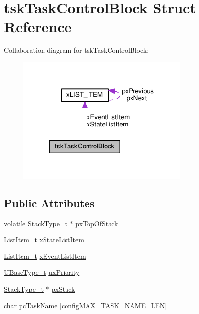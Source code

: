 \hypertarget{structtsk_task_control_block}{}\section{tsk\+Task\+Control\+Block Struct Reference}
\label{structtsk_task_control_block}


Collaboration diagram for tsk\+Task\+Control\+Block\+:\nopagebreak
\begin{figure}[H]
\begin{center}
\leavevmode
\includegraphics[width=240pt]{structtsk_task_control_block__coll__graph}
\end{center}
\end{figure}
\subsection*{Public Attributes}
\begin{DoxyCompactItemize}
\item 
volatile \hyperlink{portmacro_8h_a84e9a8ba132feed0b2401c1f4e2ac63c}{Stack\+Type\+\_\+t} $\ast$ \hyperlink{structtsk_task_control_block_a429a186c7f8e34aba1eef5e12d215b90}{px\+Top\+Of\+Stack}
\item 
\hyperlink{list_8h_a1a62d469392f9bfe2443e7efab9c8398}{List\+Item\+\_\+t} \hyperlink{structtsk_task_control_block_a16e0d20425d53ac78537e1fdb8834cf6}{x\+State\+List\+Item}
\item 
\hyperlink{list_8h_a1a62d469392f9bfe2443e7efab9c8398}{List\+Item\+\_\+t} \hyperlink{structtsk_task_control_block_a1a1612b6081a13683808284d93a9b28f}{x\+Event\+List\+Item}
\item 
\hyperlink{portmacro_8h_a646f89d4298e4f5afd522202b11cb2e6}{U\+Base\+Type\+\_\+t} \hyperlink{structtsk_task_control_block_a79187811e3d2a15595942e3b44237d85}{ux\+Priority}
\item 
\hyperlink{portmacro_8h_a84e9a8ba132feed0b2401c1f4e2ac63c}{Stack\+Type\+\_\+t} $\ast$ \hyperlink{structtsk_task_control_block_a9a0d71a9f95dd0609f9911d9efd79134}{px\+Stack}
\item 
char \hyperlink{structtsk_task_control_block_a67d61291794f38afb5be5132078bc24f}{pc\+Task\+Name} \mbox{[}\hyperlink{_free_r_t_o_s_config_8h_ac388dc4041aab6997348828eb27fc1a8}{config\+M\+A\+X\+\_\+\+T\+A\+S\+K\+\_\+\+N\+A\+M\+E\+\_\+\+L\+EN}\mbox{]}
\end{DoxyCompactItemize}


